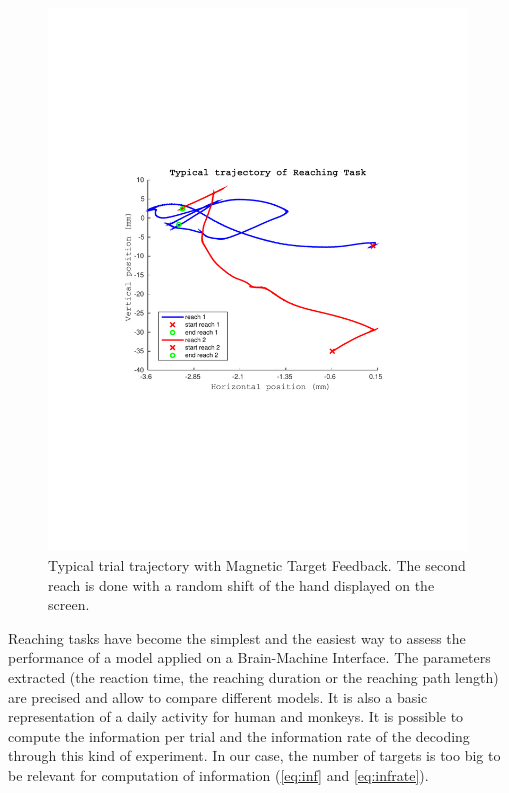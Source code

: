 \documentclass[preprint,12pt]{elsarticle}
\begin{document}
\begin{figure}[htbp]
\centering
\includegraphics[width=0.99\textwidth,trim={4cm 8cm 4cm 8cm},clip]{figures/RT_trajectory.pdf}
\caption[Trial trajectory]{Typical trial trajectory with Magnetic Target Feedback. The second reach is done with a random shift of the hand displayed on the screen.}
\label{fig:RTtrajectory}
\end{figure}

Reaching tasks have become the simplest and the easiest way to assess the performance of a model applied on a Brain-Machine Interface. The parameters extracted (the reaction time, the reaching duration or the reaching path length) are precised and allow to compare different models. It is also a basic representation of a daily activity for human and monkeys. It is possible to compute the information per trial and the information rate of the decoding through this kind of experiment. In our case, the number of targets is too big to be relevant for computation of information (\ref{eq:inf} and \ref{eq:infrate}). 
\end{document}
